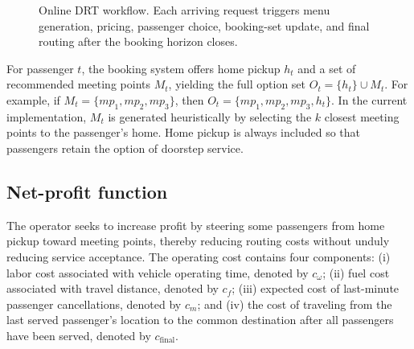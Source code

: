 \documentclass[preprint,12pt,authoryear]{elsarticle}
\begin{document}
\begin{figure}[t]
\centering
{}
\caption{Online DRT workflow. Each arriving request triggers menu generation, pricing, passenger choice, booking-set update, and final routing after the booking horizon closes.}
\label{fig:workflow}
\end{figure}

For passenger $t$, the booking system offers home pickup $h_t$ and a set of recommended meeting points $M_t$, yielding the full option set $O_t = \{h_t\}\cup M_t$. For example, if $M_t = \{mp_1, mp_2, mp_3\}$, then $O_t = \{mp_1, mp_2, mp_3, h_t\}$. In the current implementation, $M_t$ is generated heuristically by selecting the $k$ closest meeting points to the passenger's home. Home pickup is always included so that passengers retain the option of doorstep service.

\subsection{Net-profit function}

The operator seeks to increase profit by steering some passengers from home pickup toward meeting points, thereby reducing routing costs without unduly reducing service acceptance. The operating cost contains four components: (i) labor cost associated with vehicle operating time, denoted by $c_{\omega}$; (ii) fuel cost associated with travel distance, denoted by $c_f$; (iii) expected cost of last-minute passenger cancellations, denoted by $c_m$; and (iv) the cost of traveling from the last served passenger's location to the common destination after all passengers have been served, denoted by $c_{\text{final}}$.
\end{document}
